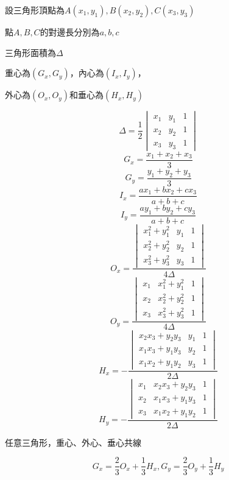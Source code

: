 設三角形頂點為$A(x_1, y_1), B(x_2, y_2), C(x_3, y_3)$ \par
點$A, B, C$的對邊長分別為$a, b, c$ \par
三角形面積為$\Delta$ \par
重心為$(G_x, G_y)$，內心為$(I_x, I_y)$， \par
外心為$(O_x, O_y)$和垂心為$(H_x, H_y)$ \par
\[
    \Delta = \frac{1}{2}
    \begin{vmatrix}
        x_1 & y_1 & 1\\
        x_2 & y_2 & 1\\
        x_3 & y_3 & 1
    \end{vmatrix}
\]
\[
    G_x = \frac{x_1+x_2+x_3}{3}
\]
\[
    G_y = \frac{y_1+y_2+y_3}{3}
\]
\[
    I_x = \frac{ax_1+bx_2+cx_3}{a+b+c}
\]
\[
    I_y = \frac{ay_1+by_2+cy_3}{a+b+c}
\]
\[
    O_x = \frac{\begin{vmatrix}
        x_1^2+y_1^2 & y_1 & 1\\
        x_2^2+y_2^2 & y_2 & 1\\
        x_3^2+y_3^2 & y_3 & 1
      \end{vmatrix}}{4\Delta}
\]
\[
    O_y = \frac{\begin{vmatrix}
        x_1 & x_1^2+y_1^2 & 1\\
        x_2 & x_2^2+y_2^2 & 1\\
        x_3 & x_3^2+y_3^2 & 1
      \end{vmatrix}}{4\Delta}
\]
\[
    H_x = -\frac{\begin{vmatrix}
        x_2x_3+y_2y_3 & y_1 & 1\\
        x_1x_3+y_1y_3 & y_2 & 1\\
        x_1x_2+y_1y_2 & y_3 & 1
      \end{vmatrix}}{2\Delta}
\]
\[
    H_y = -\frac{\begin{vmatrix}
        x_1 & x_2x_3+y_2y_3 & 1\\
        x_2 & x_1x_3+y_1y_3 & 1\\
        x_3 & x_1x_2+y_1y_2 & 1
      \end{vmatrix}}{2\Delta}
\]

任意三角形，重心、外心、垂心共線 \par
\[
      G_x = \frac{2}{3}O_x+\frac{1}{3}H_x, 
      G_y = \frac{2}{3}O_y+\frac{1}{3}H_y
\]